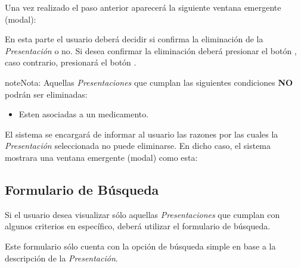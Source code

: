 \documentclass[a4paper,10pt,spanish]{sphinxmanual}
\begin{document}

Una vez realizado el paso anterior aparecerá la siguiente ventana emergente (modal):


En esta parte el usuario deberá decidir si confirma la eliminación de la \emph{Presentación} o no. Si desea confirmar la eliminación deberá presionar el botón , caso contrario, presionará el botón .

\begin{notice}{note}{Nota:}
Aquellas \emph{Presentaciones} que cumplan las siguientes condiciones \textbf{NO} podrán ser eliminadas:
\begin{itemize}
\item {} 
Esten asociadas a un medicamento.

\end{itemize}

El sistema se encargará de informar al usuario las razones por las cuales la \emph{Presentación} seleccionada no puede eliminarse. En dicho caso, el sistema mostrara una ventana emergente (modal) como esta:

\end{notice}


\subsection{Formulario de Búsqueda}
\label{presentaciones:formulario-de-busqueda}\label{presentaciones:formulario-busqueda-presentacion}
Si el usuario desea visualizar sólo aquellas \emph{Presentaciones} que cumplan con algunos criterios en específico, deberá utilizar el formulario de búsqueda.


Este formulario sólo cuenta con la opción de búsqueda simple en base a la descripción de la \emph{Presentación}.
\end{document}
